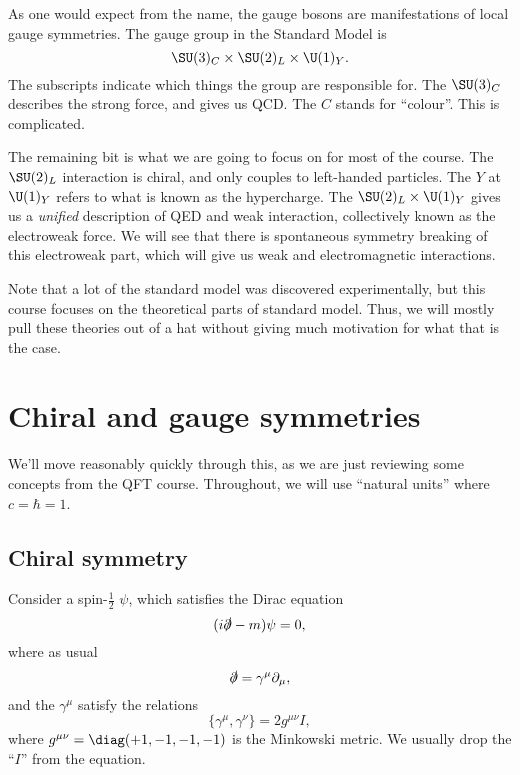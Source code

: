 \documentclass[a4paper]{article}
\begin{document}
As one would expect from the name, the gauge bosons are manifestations of local gauge symmetries. The gauge group in the Standard Model is
\[
  \SU(3)_C \times \SU(2)_L \times \U(1)_Y.
\]
The subscripts indicate which things the group are responsible for. The $\SU(3)_C$ describes the strong force, and gives us QCD. The $C$ stands for ``colour''. This is complicated.

The remaining bit is what we are going to focus on for most of the course. The $\SU(2)_L$ interaction is chiral, and only couples to left-handed particles. The $Y$ at $\U(1)_Y$ refers to what is known as the hypercharge. The $\SU(2)_L \times \U(1)_Y$ gives us a \emph{unified} description of QED and weak interaction, collectively known as the electroweak force. We will see that there is spontaneous symmetry breaking of this electroweak part, which will give us weak and electromagnetic interactions.

Note that a lot of the standard model was discovered experimentally, but this course focuses on the theoretical parts of standard model. Thus, we will mostly pull these theories out of a hat without giving much motivation for what that is the case.

\section{Chiral and gauge symmetries}
We'll move reasonably quickly through this, as we are just reviewing some concepts from the QFT course. Throughout, we will use ``natural units'' where $c = \hbar = 1$.

\subsection{Chiral symmetry}
Consider a spin-$\frac{1}{2}$  $\psi$, which satisfies the Dirac equation
\[
  (i \slashed{\partial} - m) \psi = 0,
\]
where as usual
\[
  \slashed{\partial} = \gamma^\mu \partial_\mu,
\]
and the \index{$\gamma^\mu$} $\gamma^\mu$ satisfy the  relations
\[
  \{\gamma^\mu, \gamma^\nu\} = 2 g^{\mu\nu} I,
\]
where $g^{\mu\nu} = \diag(+1, -1, -1, -1)$ is the Minkowski metric. We usually drop the ``$I$'' from the equation.
\end{document}
